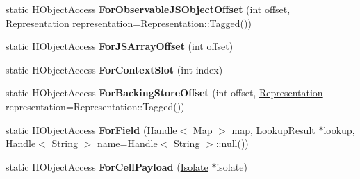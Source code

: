 \begin{DoxyCompactItemize}
\item 
\hypertarget{classv8_1_1internal_1_1_v8___f_i_n_a_l_a563c4bff85007ead69faf764e1b34230}{}static H\+Object\+Access {\bfseries For\+Observable\+J\+S\+Object\+Offset} (int offset, \hyperlink{classv8_1_1internal_1_1_representation}{Representation} representation=Representation\+::\+Tagged())\label{classv8_1_1internal_1_1_v8___f_i_n_a_l_a563c4bff85007ead69faf764e1b34230}

\item 
\hypertarget{classv8_1_1internal_1_1_v8___f_i_n_a_l_a3699e02fdea94a989b78d64420563158}{}static H\+Object\+Access {\bfseries For\+J\+S\+Array\+Offset} (int offset)\label{classv8_1_1internal_1_1_v8___f_i_n_a_l_a3699e02fdea94a989b78d64420563158}

\item 
\hypertarget{classv8_1_1internal_1_1_v8___f_i_n_a_l_acd714746973e94a8fc34e8eb75b5fb74}{}static H\+Object\+Access {\bfseries For\+Context\+Slot} (int index)\label{classv8_1_1internal_1_1_v8___f_i_n_a_l_acd714746973e94a8fc34e8eb75b5fb74}

\item 
\hypertarget{classv8_1_1internal_1_1_v8___f_i_n_a_l_ae5625d27142da05da77969698fbfee8a}{}static H\+Object\+Access {\bfseries For\+Backing\+Store\+Offset} (int offset, \hyperlink{classv8_1_1internal_1_1_representation}{Representation} representation=Representation\+::\+Tagged())\label{classv8_1_1internal_1_1_v8___f_i_n_a_l_ae5625d27142da05da77969698fbfee8a}

\item 
\hypertarget{classv8_1_1internal_1_1_v8___f_i_n_a_l_a73bfa7bfe879fbfc371f139c539ada2f}{}static H\+Object\+Access {\bfseries For\+Field} (\hyperlink{classv8_1_1internal_1_1_handle}{Handle}$<$ \hyperlink{classv8_1_1internal_1_1_map}{Map} $>$ map, Lookup\+Result $\ast$lookup, \hyperlink{classv8_1_1internal_1_1_handle}{Handle}$<$ \hyperlink{classv8_1_1internal_1_1_string}{String} $>$ name=\hyperlink{classv8_1_1internal_1_1_handle}{Handle}$<$ \hyperlink{classv8_1_1internal_1_1_string}{String} $>$\+::null())\label{classv8_1_1internal_1_1_v8___f_i_n_a_l_a73bfa7bfe879fbfc371f139c539ada2f}

\item 
\hypertarget{classv8_1_1internal_1_1_v8___f_i_n_a_l_a3ba0e4f55fab24e9b8d40340c625b5ef}{}static H\+Object\+Access {\bfseries For\+Cell\+Payload} (\hyperlink{classv8_1_1internal_1_1_isolate}{Isolate} $\ast$isolate)\label{classv8_1_1internal_1_1_v8___f_i_n_a_l_a3ba0e4f55fab24e9b8d40340c625b5ef}


\end{DoxyCompactItemize}
